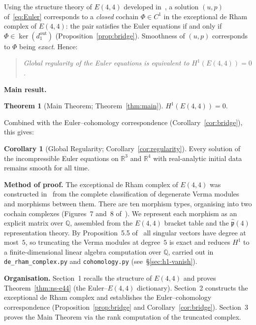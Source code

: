 \documentclass[reqno,10pt]{amsart}
\theoremstyle{definition}
\newtheorem*{theorintro}{Theorem}
\newtheorem*{corintro}{Corollary}
\begin{document}
Using the structure theory of $E(4,4)$ developed in~\cite{CCK2026}, a
solution $(u,p)$ of~\eqref{eq:Euler} corresponds to a \emph{closed}
cochain $\Phi\in C^1$ in the exceptional de Rham complex of $E(4,4)$: the
pair satisfies the Euler equations if and only if $\Phi\in\ker(d_1^{\text{out}})$
(Proposition~\ref{prop:bridge}).  Smoothness of $(u,p)$ corresponds to
$\Phi$ being \emph{exact}.  Hence:

\begin{quote}
  \emph{Global regularity of the Euler equations is equivalent to $H^1(E(4,4))=0$.}
\end{quote}

\noindent\textbf{Main result.}

\begin{theorintro}[Main Theorem; Theorem~\ref{thm:main}]
$H^1(E(4,4))=0$.
\end{theorintro}

Combined with the Euler--cohomology correspondence
(Corollary~\ref{cor:bridge}), this gives:

\begin{corintro}[Global Regularity; Corollary~\ref{cor:regularity}]
Every solution of the incompressible Euler equations on
$\mathbb{R}^3$ and $\mathbb{R}^4$ with real-analytic initial data remains smooth for all time.
\end{corintro}

\medskip
\noindent\textbf{Method of proof.}
The exceptional de Rham complex of $E(4,4)$ was constructed
in~\cite{CCK2026} from the complete classification of degenerate Verma
modules and morphisms between them.  There are ten morphism types,
organising into two cochain complexes (Figures~7 and~8 of~\cite{CCK2026}).
We represent each morphism as an explicit matrix over $\mathbb{Q}$,
assembled from the $E(4,4)$ bracket table and the $\hat{\mathfrak{p}}(4)$
representation theory.  By Proposition~5.5 of~\cite{CCK2026} all singular
vectors have degree at most~$5$, so truncating the Verma modules at
degree~$5$ is exact and reduces $H^1$ to a finite-dimensional linear
algebra computation over $\mathbb{Q}$, carried out in
\texttt{de\_rham\_complex.py} and \texttt{cohomology.py}
(see~\S\ref{sec:h1-vanish}).

\medskip
\noindent\textbf{Organisation.}
Section~1 recalls the structure of $E(4,4)$ and proves
Theorem~\ref{thm:ns-e44} (the Euler--$E(4,4)$ dictionary).
Section~2 constructs the exceptional de Rham complex and establishes
the Euler--cohomology correspondence (Proposition~\ref{prop:bridge} and
Corollary~\ref{cor:bridge}).
Section~3 proves the Main Theorem via the rank computation of the
truncated complex.
\end{document}
